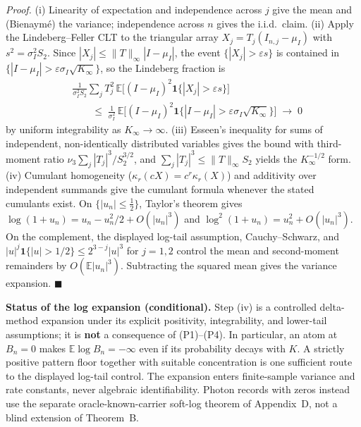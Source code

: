 \noindent\emph{Proof.} (i) Linearity of expectation and independence across $j$ give the mean and (Bienaym\'e) the variance; independence across $n$ gives the i.i.d.\ claim. (ii) Apply the Lindeberg--Feller CLT \cite[Thm.~27.2]{Billingsley1995} to the triangular array $X_j=T_j(I_{n,j}-\mu_I)$ with $s^2=\sigma_I^2 S_2$. Since $|X_j|\le \|T\|_\infty|I-\mu_I|$, the event $\{|X_j|>\varepsilon s\}$ is contained in $\{|I-\mu_I|>\varepsilon\sigma_I\sqrt{K_\infty}\}$, so the Lindeberg fraction is
\[
\begin{aligned}
&\frac{1}{\sigma_I^2 S_2}\sum_j T_j^2\,\mathbb{E}\big[(I-\mu_I)^2\mathbf 1\{|X_j|>\varepsilon s\}\big]\\
&\qquad\le\;\frac{1}{\sigma_I^2}\,\mathbb{E}\big[(I-\mu_I)^2\mathbf 1\{|I-\mu_I|>\varepsilon\sigma_I\sqrt{K_\infty}\}\big]\;\longrightarrow\;0
\end{aligned}
\]
by uniform integrability as $K_\infty\to\infty$. (iii) Esseen's inequality for sums of independent, non-identically distributed variables \cite[Ch.~V]{Petrov1975} gives the bound with third-moment ratio $\nu_3\sum_j|T_j|^3/S_2^{3/2}$, and $\sum_j|T_j|^3\le\|T\|_\infty S_2$ yields the $K_\infty^{-1/2}$ form. (iv) Cumulant homogeneity ($\kappa_r(cX)=c^r\kappa_r(X)$) and additivity over independent summands give the cumulant formula whenever the stated cumulants exist. On $\{|u_n|\le\tfrac12\}$, Taylor's theorem gives $\log(1+u_n)=u_n-u_n^2/2+O(|u_n|^3)$ and $\log^2(1+u_n)=u_n^2+O(|u_n|^3)$. On the complement, the displayed log-tail assumption, Cauchy--Schwarz, and $|u|^j\mathbf1\{|u|>1/2\}\le2^{3-j}|u|^3$ for $j=1,2$ control the mean and second-moment remainders by $O(\mathbb E|u_n|^3)$. Subtracting the squared mean gives the variance expansion. \hfill$\blacksquare$

\begin{statusblock}\textbf{Status of the log expansion (conditional).} Step (iv) is a controlled delta-method expansion under its explicit positivity, integrability, and lower-tail assumptions; it is \textbf{not} a consequence of (P1)--(P4). In particular, an atom at $B_n=0$ makes $\mathbb E\log B_n=-\infty$ even if its probability decays with $K$. A strictly positive pattern floor together with suitable concentration is one sufficient route to the displayed log-tail control. The expansion enters finite-sample variance and rate constants, never algebraic identifiability. Photon records with zeros instead use the separate oracle-known-carrier soft-log theorem of Appendix~D, not a blind extension of Theorem~B.\end{statusblock}

